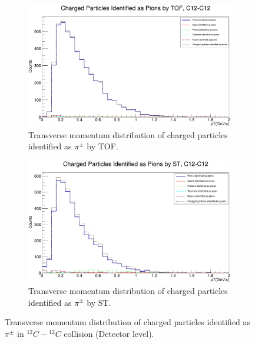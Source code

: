 \documentclass[12pt, twocolumn]{article}
\begin{document}
\begin{figure}[h]
\centering
\begin{subfigure}[h]{0.49\textwidth}
\centering
\includegraphics[scale=0.14]{Detector_pT_pions(tof)_C12.png}
\caption{Transverse momentum distribution of charged particles identified as $\pi^{\pm}$ by TOF.}
\label{Detector - Transverse momentum distribution of pions (TOF) C12.}
\end{subfigure}
\hfill
\begin{subfigure}[h]{0.49\textwidth}
\centering
\includegraphics[scale=0.14]{Detector_pT_pions(st)_C12.png}
\caption{Transverse momentum distribution of charged particles identified as $\pi^{\pm}$ by ST.}
\label{Detector - Transverse momentum distribution of pions (ST) C12.}
\end{subfigure}
\caption{Transverse momentum distribution of charged particles identified as $\pi^{\pm}$ in $^{12}C-{^{12}C}$ collision (Detector level).}
\label{Transverse momentum distribution of charged particles identified as pions in C12-C12 collision.}
\end{figure}
\end{document}
